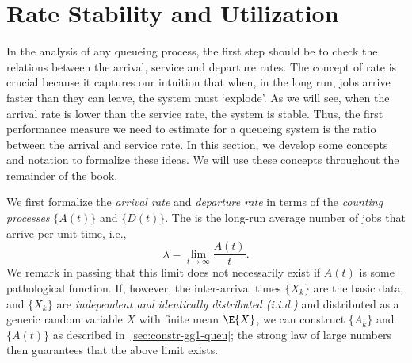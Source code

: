 \section{Rate Stability and Utilization}
\label{sec:rate-stability}



In the analysis of any queueing process, the first step should be to check the relations between the arrival, service and departure rates.
The concept of rate is crucial because it captures our intuition that when, in the long run, jobs arrive faster than they can leave, the system must `explode'.
As we will see, when the arrival rate is lower than the service rate, the system is stable.
Thus, the first performance measure we need to estimate for a queueing system is the ratio between the arrival and service rate.
In this section, we develop some concepts and notation to formalize these ideas.
We will use these concepts throughout the remainder of the book.

We first formalize the \emph{arrival rate} and \emph{departure rate} in terms of the \emph{counting processes} $\{A(t)\}$ and $\{D(t)\}$.
The  is the long-run average number of jobs that arrive per unit time, i.e.,
\begin{equation}
 \label{eq:3}
 \lambda = \lim_{t\to\infty} \frac{A(t)}t.
\end{equation}
We remark in passing that this limit does not necessarily exist if $A(t)$ is some pathological function.
If, however, the inter-arrival times $\{X_k\}$ are the basic data, and $\{X_k\}$ are \emph{independent and identically distributed (i.i.d.)}
and distributed as a generic random variable $X$ with finite mean $\E{X}$, we can construct $\{A_k\}$ and $\{A(t)\}$ as described in~\cref{sec:constr-gg1-queu}; the strong law of large numbers then guarantees that the above limit exists.

